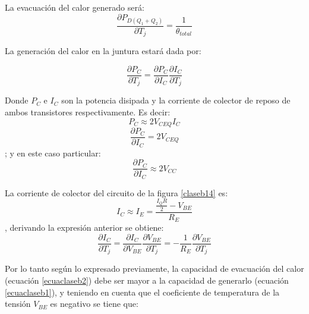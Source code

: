 La evacuación del calor generado será:
\begin{equation}\label{ecuaclaseb2}
	\frac{\displaystyle \partial P_{D(Q_1+Q_2)}}{\displaystyle
		\partial T_j}=\frac{\displaystyle 1}{\displaystyle \theta_{total}}
\end{equation}

La generación del calor en la juntura estará dada por:

\begin{equation}\label{ecuaclaseb1}
	\frac{\displaystyle \partial P_{C}}{\displaystyle
		\partial T_j}=\frac{\displaystyle \partial P_{C}}{\displaystyle
		\partial I_C}\frac{\displaystyle \partial I_{C}}{\displaystyle
		\partial T_j}
\end{equation}

Donde $P_C$ e $I_C$ son la potencia disipada y la corriente de
colector de reposo de ambos transistores respectivamente. Es decir:
\begin{equation}
	P_C\approx 2V_{CEQ}I_C
\end{equation}
\begin{equation}
	\frac{\displaystyle \partial P_{C}}{\displaystyle
		\partial I_C}=2V_{CEQ}
\end{equation}
; y en este caso particular:
\begin{equation}
	\frac{\displaystyle \partial P_{C}}{\displaystyle
		\partial I_C}\approx2V_{CC}
\end{equation}

La corriente de colector del circuito de la figura \ref{claseb14}
es:
\begin{equation}
	I_C\approx I_E=\frac{\displaystyle \frac{\displaystyle I_QR}{\displaystyle 2}-V_{BE}}{\displaystyle R_E}
\end{equation}
, derivando la expresión anterior se obtiene:
\begin{equation}
	\frac{\displaystyle \partial I_{C}}{\displaystyle
		\partial T_j}=\frac{\displaystyle \partial I_{C}}{\displaystyle
		\partial V_{BE}}\frac{\displaystyle \partial V_{BE}}{\displaystyle
		\partial T_j}=-\frac{\displaystyle 1}{\displaystyle R_E} \frac{\displaystyle \partial V_{BE}}{\displaystyle
		\partial T_j}
\end{equation}

Por lo tanto según lo expresado previamente, la capacidad de
evacuación del calor (ecuación \ref{ecuaclaseb2}) debe ser mayor a
la capacidad de generarlo (ecuación \ref{ecuaclaseb1}), y teniendo
en cuenta que el coeficiente de temperatura de la tensión $V_{BE}$
es negativo se tiene que:

